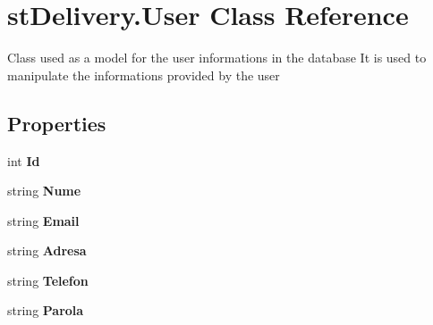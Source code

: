 \hypertarget{classst_delivery_1_1_user}{}\section{st\+Delivery.\+User Class Reference}
\label{classst_delivery_1_1_user}


Class used as a model for the user informations in the database It is used to manipulate the informations provided by the user  


\subsection*{Properties}
\begin{DoxyCompactItemize}
\item 
\mbox{\label{classst_delivery_1_1_user_a2c7d325093862df225c7691cadfdbcc3}} 
int {\bfseries Id}
\item 
\mbox{\label{classst_delivery_1_1_user_a172ff2a1b2ed3ecd92c036a959d081f5}} 
string {\bfseries Nume}
\item 
\mbox{\label{classst_delivery_1_1_user_a126af0d77375e4138848998600315253}} 
string {\bfseries Email}
\item 
\mbox{\label{classst_delivery_1_1_user_a15b49b1402d8b7d0ec47ebbcc3b08312}} 
string {\bfseries Adresa}
\item 
\mbox{\label{classst_delivery_1_1_user_ac78707499e6446da09a4b329e387c040}} 
string {\bfseries Telefon}
\item 
\mbox{\label{classst_delivery_1_1_user_a8cb08a201ff7a25d7fc93a7ce64be801}} 
string {\bfseries Parola}
\end{DoxyCompactItemize}


